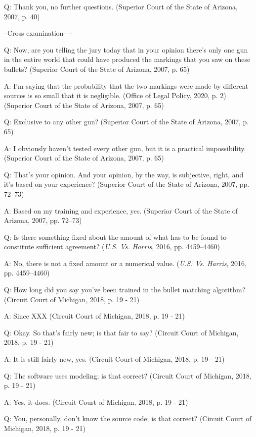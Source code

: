 \documentclass[print]{nuthesis}
\begin{document}
Q: Thank you, no further questions. (Superior Court of the State of Arizona, 2007, p. 40)

--Cross examination----

Q: Now, are you telling the jury today that in your opinion there's only one gun in the entire world that could have produced the markings that you saw on these bullets? (Superior Court of the State of Arizona, 2007, p. 65)

A: I'm saying that the probability that the two markings were made by different sources is so small that it is negligible. (Office of Legal Policy, 2020, p. 2) (Superior Court of the State of Arizona, 2007, p. 65)

Q: Exclusive to any other gun? (Superior Court of the State of Arizona, 2007, p. 65)

A: I obviously haven't tested every other gun, but it is a practical impossibility. (Superior Court of the State of Arizona, 2007, p. 65)

Q: That's your opinion. And your opinion, by the way, is subjective, right, and it's based on your experience? (Superior Court of the State of Arizona, 2007, pp. 72--73)

A: Based on my training and experience, yes. (Superior Court of the State of Arizona, 2007, pp. 72--73)

Q: Is there something fixed about the amount of what has to be found to constitute sufficient agreement? (\emph{{U.S.} Vs. {Harris}}, 2016, pp. 4459--4460)

A: No, there is not a fixed amount or a numerical value. (\emph{{U.S.} Vs. {Harris}}, 2016, pp. 4459--4460)

Q: How long did you say you've been trained in the bullet matching algorithm? (Circuit Court of Michigan, 2018, p. 19 - 21)

A: Since XXX (Circuit Court of Michigan, 2018, p. 19 - 21)

Q: Okay. So that's fairly new; is that fair to say? (Circuit Court of Michigan, 2018, p. 19 - 21)

A: It is still fairly new, yes. (Circuit Court of Michigan, 2018, p. 19 - 21)

Q: The software uses modeling; is that correct? (Circuit Court of Michigan, 2018, p. 19 - 21)

A: Yes, it does. (Circuit Court of Michigan, 2018, p. 19 - 21)

Q: You, personally, don't know the source code; is that correct? (Circuit Court of Michigan, 2018, p. 19 - 21)
\end{document}
